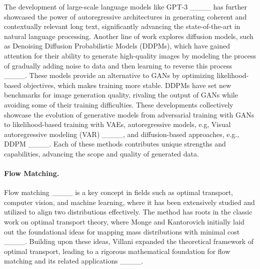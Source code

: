 The development of large-scale language models like GPT-3 ____ has further showcased the power of autoregressive architectures in generating coherent and contextually relevant long text, significantly advancing the state-of-the-art in natural language processing. Another line of work explores diffusion models, such as Denoising Diffusion Probabilistic Models (DDPMs), which have gained attention for their ability to generate high-quality images by modeling the process of gradually adding noise to data and then learning to reverse this process ____. These models provide an alternative to GANs by optimizing likelihood-based objectives, which makes training more stable. DDPMs have set new benchmarks for image generation quality, rivaling the output of GANs while avoiding some of their training difficulties. These developments collectively showcase the evolution of generative models from adversarial training with GANs to likelihood-based training with VAEs, autoregressive models, e.g, Visual autoregressive modeling (VAR) ____, and diffusion-based approaches, e.g., DDPM ____. Each of these methods contributes unique strengths and capabilities, advancing the scope and quality of generated data.

\paragraph{Flow Matching.}
Flow matching ____ is a key concept in fields such as optimal transport, computer vision, and machine learning, where it has been extensively studied and utilized to align two distributions effectively. The method has roots in the classic work on optimal transport theory, where Monge and Kantorovich initially laid out the foundational ideas for mapping mass distributions with minimal cost ____. Building upon these ideas, Villani expanded the theoretical framework of optimal transport, leading to a rigorous mathematical foundation for flow matching and its related applications ____. 

